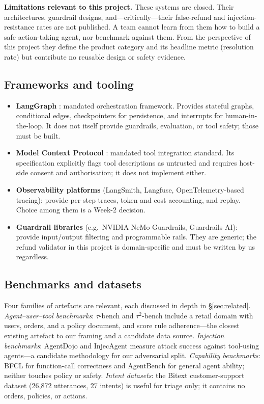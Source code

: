 \documentclass[11pt,a4paper]{article}
\begin{document}
\textbf{Limitations relevant to this project.} These systems are closed. Their architectures, guardrail designs, and---critically---their false-refund and injection-resistance rates are not published. A team cannot learn from them how to build a safe action-taking agent, nor benchmark against them. From the perspective of this project they define the product category and its headline metric (resolution rate) but contribute no reusable design or safety evidence.

\subsection{Frameworks and tooling}

\begin{itemize}
  \item \textbf{LangGraph} \citep{langgraph2026docs}: mandated orchestration framework. Provides stateful graphs, conditional edges, checkpointers for persistence, and interrupts for human-in-the-loop. It does not itself provide guardrails, evaluation, or tool safety; those must be built.
  \item \textbf{Model Context Protocol} \citep{mcp2026spec}: mandated tool integration standard. Its specification explicitly flags tool descriptions as untrusted and requires host-side consent and authorisation; it does not implement either.
  \item \textbf{Observability platforms} (LangSmith, Langfuse, OpenTelemetry-based tracing): provide per-step traces, token and cost accounting, and replay. Choice among them is a Week-2 decision.
  \item \textbf{Guardrail libraries} (e.g.\ NVIDIA NeMo Guardrails, Guardrails AI): provide input/output filtering and programmable rails. They are generic; the refund validator in this project is domain-specific and must be written by us regardless.
\end{itemize}

\subsection{Benchmarks and datasets}

Four families of artefacts are relevant, each discussed in depth in \S\ref{sec:related}. \emph{Agent--user--tool benchmarks}: $\tau$-bench \citep{yao2024taubench} and $\tau^2$-bench \citep{barres2025tau2bench} include a retail domain with users, orders, and a policy document, and score rule adherence---the closest existing artefact to our framing and a candidate data source. \emph{Injection benchmarks}: AgentDojo \citep{debenedetti2024agentdojo} and InjecAgent \citep{zhan2024injecagent} measure attack success against tool-using agents---a candidate methodology for our adversarial split. \emph{Capability benchmarks}: BFCL \citep{patil2025bfcl} for function-call correctness and AgentBench \citep{liu2023agentbench} for general agent ability; neither touches policy or safety. \emph{Intent datasets}: the Bitext customer-support dataset \citep{bitext2024dataset} (26{,}872 utterances, 27 intents) is useful for triage only; it contains no orders, policies, or actions.
\end{document}

